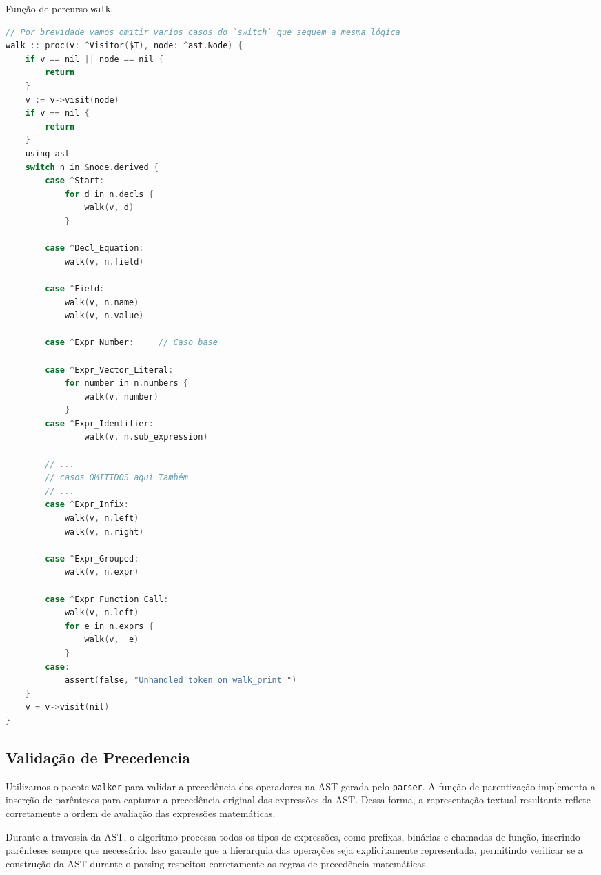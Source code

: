 \begin{codigo}[!ht]
\caption{\small Função de percurso \texttt{walk}. }
        \label{cod-visitor-walk}
\begin{lstlisting}[language = C]
// Por brevidade vamos omitir varios casos do `switch` que seguem a mesma lógica
walk :: proc(v: ^Visitor($T), node: ^ast.Node) {
    if v == nil || node == nil {
        return
    }
    v := v->visit(node)
    if v == nil {
        return
    }
    using ast
    switch n in &node.derived {
        case ^Start:
            for d in n.decls {
                walk(v, d)
            }

        case ^Decl_Equation:
            walk(v, n.field)

        case ^Field:
            walk(v, n.name)
            walk(v, n.value)

        case ^Expr_Number:     // Caso base

        case ^Expr_Vector_Literal:
            for number in n.numbers {
                walk(v, number)
            }
        case ^Expr_Identifier:
                walk(v, n.sub_expression)

        // ...
        // casos OMITIDOS aqui Também
        // ...
        case ^Expr_Infix:
            walk(v, n.left)
            walk(v, n.right)

        case ^Expr_Grouped:
            walk(v, n.expr)

        case ^Expr_Function_Call:
            walk(v, n.left)
            for e in n.exprs {
                walk(v,  e)
            }
        case:
            assert(false, "Unhandled token on walk_print ")
    }
    v = v->visit(nil)
}

  \end{lstlisting}
\end{codigo}


\subsection{Validação de Precedencia}

Utilizamos o pacote \texttt{walker} para validar a precedência dos operadores na AST gerada pelo \texttt{parser}. A função de parentização implementa a inserção de parênteses para capturar a precedência original das expressões da AST. Dessa forma, a representação textual resultante reflete corretamente a ordem de avaliação das expressões matemáticas.

Durante a travessia da AST, o algoritmo processa todos os tipos de expressões, como prefixas, binárias e chamadas de função, inserindo parênteses sempre que necessário. Isso garante que a hierarquia das operações seja explicitamente representada, permitindo verificar se a construção da AST durante o parsing respeitou corretamente as regras de precedência matemáticas.

